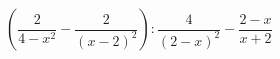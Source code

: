 \begin{ex}[type=expression]
	\begin{condition}
		\(\left( \dfrac{2}{4-x^2}-\dfrac{2}{(x-2)^2} \right):\dfrac{4}{(2-x)^2}-\dfrac{2-x}{x+2}\)
	\end{condition}
\end{ex}